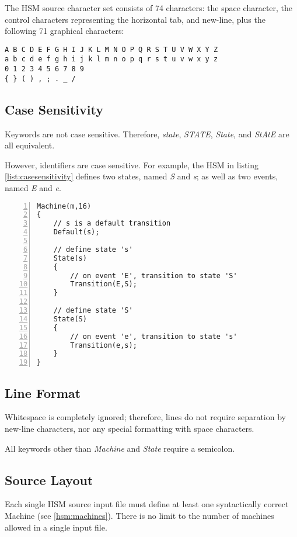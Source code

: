 \documentclass[titlepage,letterpaper]{report}
\begin{document}
The HSM source character set consists of 74 characters: the space character, the control characters
representing the horizontal tab, and new-line, plus the following 71 graphical characters:

\begin{verbatim}
A B C D E F G H I J K L M N O P Q R S T U V W X Y Z
a b c d e f g h i j k l m n o p q r s t u v w x y z
0 1 2 3 4 5 6 7 8 9
{ } ( ) , ; . _ /
\end{verbatim}

\subsection{Case Sensitivity}

Keywords are not case sensitive.  Therefore, \emph{state}, \emph{STATE}, \emph{State}, and
\emph{StAtE} are all equivalent.

However, identifiers are case sensitive.  For example, the HSM in listing \ref{list:casesensitivity} defines two states, 
named \emph{S} and \emph{s}; as well as two events, named \emph{E} and \emph{e}.

\begin{lstlisting}[caption={Case Sensitivity on Identifiers},label={list:casesensitivity},float,frame=lines,numbers=left]
Machine(m,16)
{
	// s is a default transition
	Default(s);

	// define state 's'
	State(s)
	{
		// on event 'E', transition to state 'S'
		Transition(E,S);
	}

	// define state 'S'
	State(S)
	{
		// on event 'e', transition to state 's'
		Transition(e,s);
	}
}
\end{lstlisting}

\subsection{Line Format}

Whitespace is completely ignored; therefore, lines do not require separation by new-line
characters, nor any special formatting with space characters.

All keywords other than \emph{Machine} and \emph{State} require a semicolon.

\subsection{Source Layout}

\label{hsm:file}

Each single HSM source input file must define at least one syntactically correct 
Machine (see \ref{hsm:machines}).  There is no limit to the number of machines allowed
in a single input file.
\end{document}
